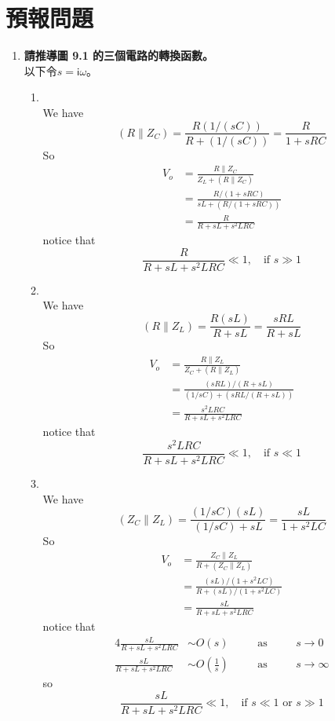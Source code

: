 \documentclass[12pt, a4paper]{article}
\def\large{\fontsize{14}{21}\selectfont}
\newcommand{\img}{\mathsf{i}}
\newcommand{\cpar}{\mathbin{\|}}
\begin{document}
\section{預報問題}

\begin{enumerate}[itemsep=20pt, topsep=10pt]
  \item {\large\bf 請推導圖 9.1 的三個電路的轉換函數。} \\[10pt]
    以下令$s = \img \omega$。
    \begin{enumerate}[label=(\alph*)]
      \item \\
        We have
        \[
          (R \cpar Z_C) = \frac{R (1/(sC))}{R + (1/(sC))} = \frac{R}{1+sRC}
        \]
        So
        \begin{align*}
        V_o &= \frac{R \cpar Z_C}{Z_L + (R \cpar Z_C)} \\
            &= \frac{R/(1+sRC)}{sL + (R/(1+sRC))} \\
            &= \frac{R}{R + sL + s^2 LRC} 
        \end{align*}
        notice that
        \[
          \frac{R}{R + sL + s^2 LRC} \ll 1 ,\quad \text{if } s \gg 1
        \]
      \item \\
        We have
        \[
          (R \cpar Z_L) = \frac{R (sL)}{R + sL} = \frac{sRL}{R+sL}
        \]
        So
        \begin{align*}
        V_o &= \frac{R \cpar Z_L}{Z_C + (R \cpar Z_L)} \\
            &= \frac{(sRL)/(R+sL)}{(1/sC) + (sRL/(R+sL))} \\
            &= \frac{s^2LRC}{R + sL + s^2 LRC} 
        \end{align*}
        notice that
        \[
          \frac{s^2LRC}{R + sL + s^2 LRC} \ll 1 ,\quad \text{if } s \ll 1
        \]
      \item \\
        We have
        \[
          (Z_C \cpar Z_L) = \frac{(1/sC) (sL)}{(1/sC)+sL} = \frac{sL}{1+s^2LC}
        \]
        So
        \begin{align*}
        V_o &= \frac{Z_C \cpar Z_L}{R + (Z_C \cpar Z_L)} \\
            &= \frac{(sL)/(1+s^2LC)}{R + (sL)/(1+s^2LC)} \\
            &= \frac{sL}{R + sL + s^2 LRC} 
        \end{align*}
        notice that
        \begin{alignat*}{4}
          \frac{sL}{R + sL + s^2 LRC} &\sim O(s) \quad && \text{as} \quad && s \rightarrow 0 \\
          \frac{sL}{R + sL + s^2 LRC} &\sim O\left(\frac{1}{s}\right) \quad && \text{as} \quad && s \rightarrow \infty
        \end{alignat*}
        so
        \[
          \frac{sL}{R + sL + s^2 LRC} \ll 1 ,\quad \text{if } s \ll 1 \text{ or } s \gg 1
        \]


\end{enumerate}
\end{enumerate}
\end{document}
